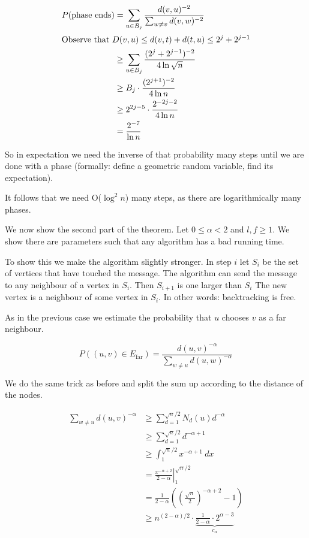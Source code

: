 \begin{pr}
\begin{align*}
P(\text{phase ends}) &= \sum_{u\in B_j} \frac{d(v,u)^{-2}}{\sum_{w\neq v} d(v,w)^{-2}}\\
\intertext{Observe that $D(v,u) \leq d(v,t)+d(t,u) \leq 2^j+2^{j-1}$}
&\geq \sum_{u\in B_j} \frac{(2^j+2^{j-1})^{-2}}{4\ln \sqrt{n}}\\
&\geq B_j \cdot \frac{(2^{j+1})^{-2}}{4\ln n}\\
&\geq 2^{2j-5} \cdot \frac{2^{-2j-2}}{4\ln n}\\
&=\frac{2^{-7}}{\ln n}
\end{align*}

So in expectation we need the inverse of that probability many steps until we are done with a phase (formally: define a geometric random variable, find its expectation).

It follows that we need O($\log^2n$) many steps, as there are logarithmically many phases.

We now show the second part of the theorem. Let $0\leq \alpha < 2$ and $l,f\geq 1$. We show there are parameters such that any algorithm has a bad running time.

To show this we make the algorithm slightly stronger. In step $i$ let $S_i$ be the set of vertices that have touched the message. The algorithm can send the message to any neighbour of a vertex in $S_i$. Then $S_{i+1}$ is one larger than $S_i$ The new vertex is a neighbour of some vertex in $S_i$.  In other words: backtracking is free.

As in the previous case we estimate the probability that $u$ chooses $v$ as a far neighbour.

\[P((u,v)\in E_{\text{far}}) = \frac{d(u,v)^{-\alpha}}{\sum_{w\neq u}d(u,w)^{-\alpha}}\]

We do the same trick as before and split the sum up according to the distance of the nodes.

\begin{align*}
\sum_{w\neq u} d(u,v)^{-\alpha} &\geq \sum_{d=1}^{\sqrt{n}/2} N_d(u)d^{-\alpha}\\
	&\geq \sum_{d=1}^{\sqrt n/2} d^{-\alpha +1}\\
	&\geq \int_1^{\sqrt{n}/2} x^{-\alpha+1}\ dx\\
	&=\left. \frac{x^{-\alpha +2}}{2-\alpha}\right|_1^{\sqrt{n}/2}\\
	&=\frac{1}{2-\alpha} ((\frac{\sqrt n}{2})^{-\alpha +2} -1)\\
	&\geq n^{(2-\alpha)/2} \cdot \underbrace{\frac{1}{2-\alpha} \cdot 2^{\alpha-3}}_{c_\alpha}
\end{align*}


\end{pr}
